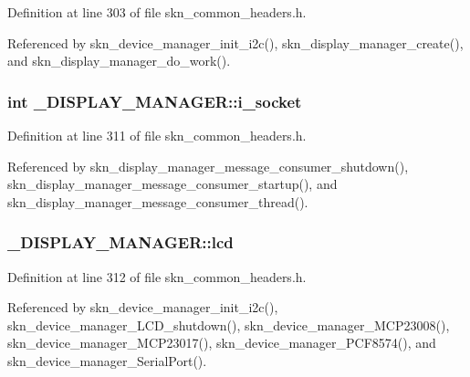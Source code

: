 Definition at line 303 of file skn\+\_\+common\+\_\+headers.\+h.



Referenced by skn\+\_\+device\+\_\+manager\+\_\+init\+\_\+i2c(), skn\+\_\+display\+\_\+manager\+\_\+create(), and skn\+\_\+display\+\_\+manager\+\_\+do\+\_\+work().

\subsubsection[{\texorpdfstring{i\+\_\+socket}{i_socket}}]{\setlength{\rightskip}{0pt plus 5cm}int \+\_\+\+D\+I\+S\+P\+L\+A\+Y\+\_\+\+M\+A\+N\+A\+G\+E\+R\+::i\+\_\+socket}\hypertarget{struct___d_i_s_p_l_a_y___m_a_n_a_g_e_r_a23e726562acd51d59c09eafa6f179137}{}\label{struct___d_i_s_p_l_a_y___m_a_n_a_g_e_r_a23e726562acd51d59c09eafa6f179137}


Definition at line 311 of file skn\+\_\+common\+\_\+headers.\+h.



Referenced by skn\+\_\+display\+\_\+manager\+\_\+message\+\_\+consumer\+\_\+shutdown(), skn\+\_\+display\+\_\+manager\+\_\+message\+\_\+consumer\+\_\+startup(), and skn\+\_\+display\+\_\+manager\+\_\+message\+\_\+consumer\+\_\+thread().

\subsubsection[{\texorpdfstring{lcd}{lcd}}]{ \+\_\+\+D\+I\+S\+P\+L\+A\+Y\+\_\+\+M\+A\+N\+A\+G\+E\+R\+::lcd}\hypertarget{struct___d_i_s_p_l_a_y___m_a_n_a_g_e_r_a182e9fb6ca9f11b3e0a35628123d46f5}{}\label{struct___d_i_s_p_l_a_y___m_a_n_a_g_e_r_a182e9fb6ca9f11b3e0a35628123d46f5}


Definition at line 312 of file skn\+\_\+common\+\_\+headers.\+h.



Referenced by skn\+\_\+device\+\_\+manager\+\_\+init\+\_\+i2c(), skn\+\_\+device\+\_\+manager\+\_\+\+L\+C\+D\+\_\+shutdown(), skn\+\_\+device\+\_\+manager\+\_\+\+M\+C\+P23008(), skn\+\_\+device\+\_\+manager\+\_\+\+M\+C\+P23017(), skn\+\_\+device\+\_\+manager\+\_\+\+P\+C\+F8574(), and skn\+\_\+device\+\_\+manager\+\_\+\+Serial\+Port().

